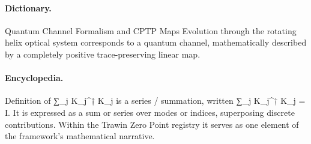 \paragraph{Dictionary.}
Quantum Channel Formalism and CPTP Maps Evolution through the rotating helix optical system corresponds to a quantum channel, mathematically described by a completely positive trace-preserving linear map.

\paragraph{Encyclopedia.}
Definition of ∑\_j K\_j\textasciicircum{}† K\_j is a series / summation, written ∑\_j K\_j\textasciicircum{}† K\_j = I. It is expressed as a sum or series over modes or indices, superposing discrete contributions. Within the Trawin Zero Point registry it serves as one element of the framework's mathematical narrative.
